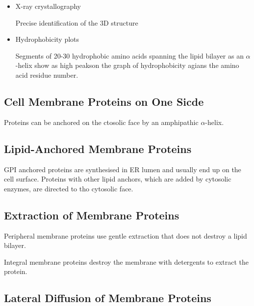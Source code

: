 \documentclass[11pt]{scrartcl}
\begin{document}
\begin{itemize}
\item X-ray crystallography
  
 Precise identification of the 3D structure

\item Hydrophobicity plots
  
  Segments of 20-30 hydrophobic amino acids spanning the lipid bilayer
  as an $\alpha$-helix show as high peakson the graph of
  hydrophobicity agians the amino acid residue number.

\end{itemize}

\subsection{Cell Membrane Proteins on One Sicde}

Proteins can be anchored on the ctosolic face by an amphipathic $\alpha$-helix.

\subsection{Lipid-Anchored Membrane Proteins}

GPI anchored proteins are synthesised in ER lumen and usually end up
on the cell surface. Proteins with other lipid anchors, which are
added by cytosolic enzymes, are directed to tho cytosolic face.


\subsection{Extraction of Membrane Proteins}

Peripheral membrane proteins use gentle extraction that does not destroy a lipid bilayer.

Integral membrane proteins destroy the membrane with detergents to extract the protein.

\subsection{Lateral Diffusion of Membrane Proteins}
\end{document}
